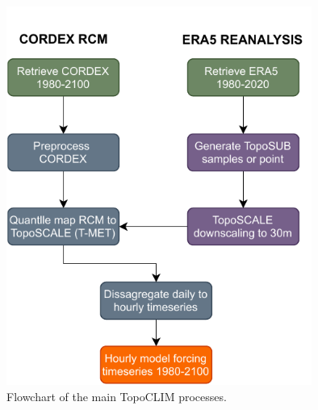 \documentclass[hess, manuscript]{copernicus}
\begin{document}
\begin{figure}[t]
\includegraphics[width=10cm]{"plots/qmap_flow2.pdf"}
\caption{Flowchart of the main TopoCLIM processes.}
\label{fig:flow}
\end{figure}
\end{document}
